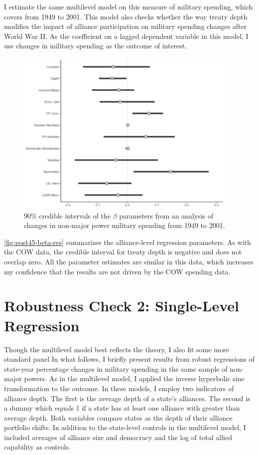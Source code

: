 \documentclass[12pt]{article}
\begin{document}
I estimate the same multilevel model on this measure of military spending, which covers from 1949 to 2001. 
This model also checks whether the way treaty depth modifies the impact of alliance participation on military spending changes after World War II.
As the coefficient on a lagged dependent variable in this model, I use changes in military spending as the outcome of interest. 


\begin{figure}[htbp]
	\centering
		\includegraphics[width=0.95\textwidth]{post45-beta-res.png}
	\caption{90\% credible intervals of the $\beta$ parameters from an analysis of changes in non-major power military spending from 1949 to 2001.}
	\label{fig:post45-beta-res}
\end{figure}


\autoref{fig:post45-beta-res} summarizes the alliance-level regression parameters. 
As with the COW data, the credible interval for treaty depth is negative and does not overlap zero. 
All the parameter estimates are similar in this data, which increases my confidence that the results are not driven by the COW spending data. 

 


\section{Robustness Check 2: Single-Level Regression}

Though the multilevel model best reflects the theory, I also fit some more standard panel 
In what follows, I briefly present results from robust regressions of state-year percentage changes in military spending in the same sample of non-major powers. 
As in the multilevel model, I applied the inverse hyperbolic sine transformation to the outcome. 
In these models, I employ two indicators of alliance depth. 
The first is the average depth of a state's alliances. 
The second is a dummy which equals 1 if a state has at least one alliance with greater than average depth. 
Both variables compare states as the depth of their alliance portfolio shifts. 
In addition to the state-level controls in the multilevel model, I included averages of alliance size and democracy and the log of total allied capability as controls. 
\end{document}
